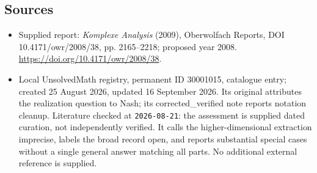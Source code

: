 \documentclass[11pt]{article}
\begin{document}
\subsection{Sources}
\begin{itemize}
\item Supplied report: \emph{Komplexe Analysis} (2009), Oberwolfach Reports, DOI 10.4171/owr/2008/38, pp. 2165--2218; proposed year 2008. \url{https://doi.org/10.4171/owr/2008/38}.
\item Local UnsolvedMath registry, permanent ID 30001015, catalogue entry; created 25 August 2026, updated 16 September 2026. Its original attributes the realization question to Nash; its corrected\_verified note reports notation cleanup. Literature checked at \texttt{2026-08-21}: the assessment is supplied dated curation, not independently verified. It calls the higher-dimensional extraction imprecise, labels the broad record open, and reports substantial special cases without a single general answer matching all parts. No additional external reference is supplied.
\end{itemize}
\end{document}
